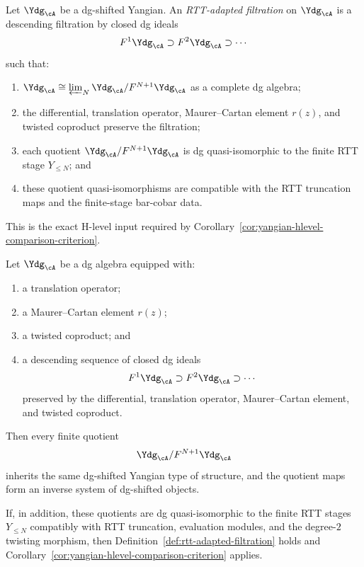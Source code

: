 \begin{definition}
\label{def:rtt-adapted-filtration}
Let $\Ydg_{\cA}$ be a dg-shifted Yangian. An
\emph{RTT-adapted filtration} on $\Ydg_{\cA}$ is a descending
filtration by closed dg ideals
\[
F^1\Ydg_{\cA} \supset F^2\Ydg_{\cA} \supset \cdots
\]
such that:
\begin{enumerate}
\item $\Ydg_{\cA} \cong
 \varprojlim_N \Ydg_{\cA}/F^{N+1}\Ydg_{\cA}$ as a complete dg algebra;
\item the differential, translation operator, Maurer--Cartan element
 $r(z)$, and twisted coproduct preserve the filtration;
\item each quotient
 $\Ydg_{\cA}/F^{N+1}\Ydg_{\cA}$ is dg quasi-isomorphic to the finite
 RTT stage $Y_{\le N}$; and
\item these quotient quasi-isomorphisms are compatible with the RTT
 truncation maps and the finite-stage bar-cobar data.
\end{enumerate}
This is the exact H-level input required by
Corollary~\ref{cor:yangian-hlevel-comparison-criterion}.
\end{definition}

\begin{proposition}
\label{prop:dg-shifted-quotient-criterion}
Let $\Ydg_{\cA}$ be a dg algebra equipped with:
\begin{enumerate}
\item a translation operator;
\item a Maurer--Cartan element $r(z)$;
\item a twisted coproduct; and
\item a descending sequence of closed dg ideals
 \[
 F^1\Ydg_{\cA} \supset F^2\Ydg_{\cA} \supset \cdots
 \]
 preserved by the differential, translation operator,
 Maurer--Cartan element, and twisted coproduct.
\end{enumerate}
Then every finite quotient
\[
\Ydg_{\cA}/F^{N+1}\Ydg_{\cA}
\]
inherits the same dg-shifted Yangian type of structure, and the quotient
maps form an inverse system of dg-shifted objects.

If, in addition, these quotients are dg quasi-isomorphic to the finite
RTT stages $Y_{\le N}$ compatibly with RTT truncation, evaluation
modules, and the degree-$2$ twisting morphism, then
Definition~\ref{def:rtt-adapted-filtration} holds and
Corollary~\ref{cor:yangian-hlevel-comparison-criterion} applies.
\end{proposition}

